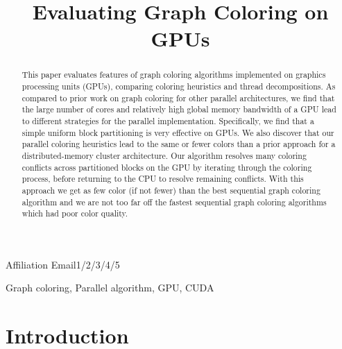 \documentclass[preprint]{sigplanconf}
\begin{document}
\copyrightdata{[to be supplied]}


\title{Evaluating Graph Coloring on GPUs}

           {Affiliation}
           {Email1/2/3/4/5}

\maketitle

\begin{abstract}
This paper evaluates features of graph coloring algorithms implemented on graphics processing units (GPUs), comparing coloring heuristics and thread decompositions.  As compared to prior work on graph coloring for other parallel architectures, we find that the large number of cores and relatively high global memory bandwidth of a GPU lead to different strategies for the parallel implementation.  Specifically, we find that a simple uniform block partitioning is very effective on GPUs.  We also discover that our parallel coloring heuristics lead to the same or fewer colors than a prior approach for a distributed-memory cluster architecture.  Our algorithm resolves many coloring conflicts across partitioned blocks on the GPU by iterating through the coloring process, before returning to the CPU to resolve remaining conflicts. With this approach we get as few color (if not fewer) than the best sequential graph coloring algorithm and we are not too far off the fastest sequential graph coloring algorithms which had poor color quality.

\end{abstract}



\keywords
Graph coloring, Parallel algorithm, GPU, CUDA

\section{Introduction}
\end{document}
